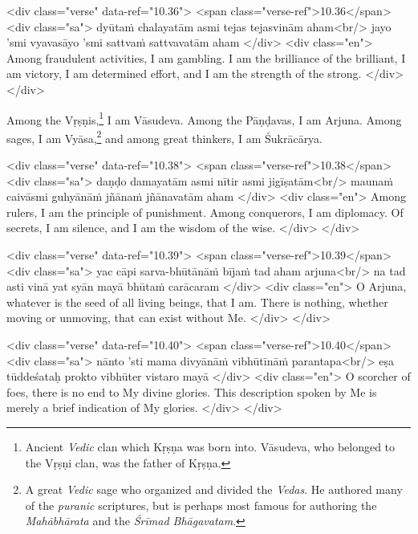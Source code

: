 \begin{html}
<div class="verse" data-ref="10.36">
  <span class="verse-ref">10.36</span>
  <div class="sa">
    dyūtaṁ chalayatām asmi tejas tejasvinām aham<br/>
    jayo ’smi vyavasāyo ’smi sattvaṁ sattvavatām aham
  </div>
  <div class="en">
    Among fraudulent activities, I am gambling. I am the brilliance of the brilliant, I am victory, I am determined effort, and I am the strength of the strong.
  </div>
</div>
\end{html}


{Among the Vṛṣṇis,\footnote{Ancient \textit{Vedic} clan which Kṛṣṇa was born into. Vāsudeva, who belonged to the Vṛṣṇi clan, was the father of Kṛṣṇa.} I am Vāsudeva. Among the Pāṇḍavas, I am Arjuna. Among sages, I am Vyāsa,\footnote{A great \textit{Vedic} sage who organized and divided the \textit{Vedas}. He authored many of the \textit{puranic} scriptures, but is perhaps most famous for authoring the \textit{Mahābhārata} and the \textit{Śrīmad Bhāgavatam}.} and among great thinkers, I am Śukrācārya.}


\begin{html}
<div class="verse" data-ref="10.38">
  <span class="verse-ref">10.38</span>
  <div class="sa">
    daṇḍo damayatām asmi nītir asmi jigīṣatām<br/>
    maunaṁ caivāsmi guhyānāṁ jñānaṁ jñānavatām aham
  </div>
  <div class="en">
    Among rulers, I am the principle of punishment. Among conquerors, I am diplomacy. Of secrets, I am silence, and I am the wisdom of the wise.
  </div>
</div>
\end{html}



\begin{html}
<div class="verse" data-ref="10.39">
  <span class="verse-ref">10.39</span>
  <div class="sa">
    yac cāpi sarva-bhūtānāṁ bījaṁ tad aham arjuna<br/>
    na tad asti vinā yat syān mayā bhūtaṁ carācaram
  </div>
  <div class="en">
    O Arjuna, whatever is the seed of all living beings, that I am. There is nothing, whether moving or unmoving, that can exist without Me.
  </div>
</div>
\end{html}



\begin{html}
<div class="verse" data-ref="10.40">
  <span class="verse-ref">10.40</span>
  <div class="sa">
    nānto ’sti mama divyānāṁ vibhūtīnāṁ parantapa<br/>
    eṣa tūddeśataḥ prokto vibhūter vistaro mayā
  </div>
  <div class="en">
    O scorcher of foes, there is no end to My divine glories. This description spoken by Me is merely a brief indication of My glories.
  </div>
</div>
\end{html}




